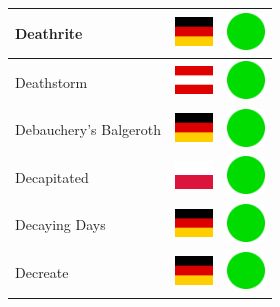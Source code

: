 \documentclass[12pt, a4paper, twoside]{report}
\begin{document}
\begin{center}
\begin{longtable}{|p{5cm}|p{2cm}|p{2cm}|}
 Deathrite                                                  & \includegraphics[width=1cm]{../img/flags/de} &   \includegraphics[width=1cm]{../likes/y} \\ \hline
 Deathstorm                                                 & \includegraphics[width=1cm]{../img/flags/at} &   \includegraphics[width=1cm]{../likes/y} \\ \hline
 Debauchery's Balgeroth                                     & \includegraphics[width=1cm]{../img/flags/de} &   \includegraphics[width=1cm]{../likes/y} \\ \hline
 Decapitated                                                & \includegraphics[width=1cm]{../img/flags/pl} &   \includegraphics[width=1cm]{../likes/y} \\ \hline
 Decaying Days                                              & \includegraphics[width=1cm]{../img/flags/de} &   \includegraphics[width=1cm]{../likes/y} \\ \hline
 Decreate                                                   & \includegraphics[width=1cm]{../img/flags/de} &   \includegraphics[width=1cm]{../likes/y} \\ \hline

\end{longtable}
\end{center}
\end{document}

